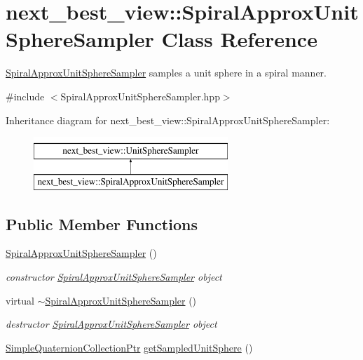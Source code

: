 \hypertarget{classnext__best__view_1_1SpiralApproxUnitSphereSampler}{\section{next\-\_\-best\-\_\-view\-:\-:\-Spiral\-Approx\-Unit\-Sphere\-Sampler \-Class \-Reference}
\label{classnext__best__view_1_1SpiralApproxUnitSphereSampler}
}


\hyperlink{classnext__best__view_1_1SpiralApproxUnitSphereSampler}{\-Spiral\-Approx\-Unit\-Sphere\-Sampler} samples a unit sphere in a spiral manner.  




{\ttfamily \#include $<$\-Spiral\-Approx\-Unit\-Sphere\-Sampler.\-hpp$>$}

\-Inheritance diagram for next\-\_\-best\-\_\-view\-:\-:\-Spiral\-Approx\-Unit\-Sphere\-Sampler\-:\begin{figure}[H]
\begin{center}
\leavevmode
\includegraphics[height=2.000000cm]{classnext__best__view_1_1SpiralApproxUnitSphereSampler}
\end{center}
\end{figure}
\subsection*{\-Public \-Member \-Functions}
\begin{DoxyCompactItemize}
\item 
\hyperlink{classnext__best__view_1_1SpiralApproxUnitSphereSampler_a3ba27a56b61f6fc052e19d2aa2f20b85}{\-Spiral\-Approx\-Unit\-Sphere\-Sampler} ()
\begin{DoxyCompactList}\small\item\em constructor \hyperlink{classnext__best__view_1_1SpiralApproxUnitSphereSampler}{\-Spiral\-Approx\-Unit\-Sphere\-Sampler} object \end{DoxyCompactList}\item 
virtual \hyperlink{classnext__best__view_1_1SpiralApproxUnitSphereSampler_a41f4b8e54ba28a42094ca09737a53bb9}{$\sim$\-Spiral\-Approx\-Unit\-Sphere\-Sampler} ()
\begin{DoxyCompactList}\small\item\em destructor \hyperlink{classnext__best__view_1_1SpiralApproxUnitSphereSampler}{\-Spiral\-Approx\-Unit\-Sphere\-Sampler} object \end{DoxyCompactList}\item 
\hyperlink{namespacenext__best__view_a56eab77c28120ee9265ea6fa82a4a3c5}{\-Simple\-Quaternion\-Collection\-Ptr} \hyperlink{classnext__best__view_1_1SpiralApproxUnitSphereSampler_a0c541d110ab5d5ddb9991db848d729e5}{get\-Sampled\-Unit\-Sphere} ()
\end{DoxyCompactItemize}



